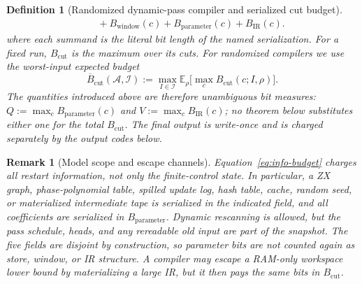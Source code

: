 \documentclass[a4paper,twocolumn,10pt,unpublished]{quantumarticle}
\newtheorem{definition}{Definition}
\newtheorem{remark}{Remark}
\begin{document}
\begin{definition}[Randomized dynamic-pass compiler and serialized cut budget]
\begin{equation}
{\begin{aligned}
&\quad+B_{\mathrm{window}}(c)+B_{\mathrm{parameter}}(c)
      +B_{\mathrm{IR}}(c).
\end{aligned}}
\end{equation}
where each summand is the literal bit length of the named serialization.
For a fixed run, $B_{\mathrm{cut}}$ is the maximum over its cuts.  For
randomized compilers we use the worst-input expected budget
\begin{equation}
\label{eq:expected-cut}
 \overline B_{\mathrm{cut}}(\mathcal A,\mathcal I)
 :=\max_{I\in\mathcal I}\mathbb E_\rho
       \bigl[\max_c B_{\mathrm{cut}}(c;I,\rho)\bigr].
\end{equation}
The quantities introduced above are therefore
unambiguous bit measures:
$Q:=\max_c B_{\mathrm{parameter}}(c)$ and
$V:=\max_c B_{\mathrm{IR}}(c)$; no theorem below substitutes either one
for the total $B_{\mathrm{cut}}$.  The final output is write-once and is
charged separately by the output codes below.
\end{definition}

\begin{remark}[Model scope and escape channels]
\label{rem:escape-channels}
Equation~\eqref{eq:info-budget} charges all restart information, not only
the finite-control state.  In particular, a ZX graph, phase-polynomial
table, spilled update log, hash table, cache, random seed, or materialized
intermediate tape is serialized in the indicated field, and all coefficients
are serialized in $B_{\mathrm{parameter}}$.  Dynamic rescanning is allowed,
but the pass schedule, heads, and any rereadable old input are part of the
snapshot.  The five fields are disjoint by construction, so parameter bits
are not counted again as store, window, or IR structure.  A compiler may
escape a RAM-only workspace lower bound by materializing a large IR, but it
then pays the same bits in $B_{\mathrm{cut}}$.
\end{remark}
\end{document}
